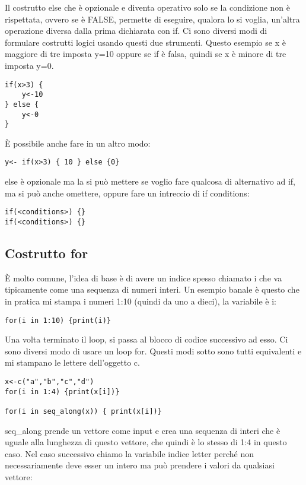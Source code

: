 Il costrutto \textsf{else} che è opzionale e diventa operativo solo se la condizione non è rispettata, ovvero se è \textsf{FALSE}, permette di eseguire, qualora lo si voglia, un'altra operazione diversa dalla prima dichiarata con \textsf{if}. Ci sono diversi modi di formulare costrutti logici usando questi due strumenti.
Questo esempio se x è maggiore di tre \erre imposta y=10 oppure se if è falsa,
quindi se x è minore di tre \erre imposta y=0.
\begin{lstlisting}
if(x>3) {
	y<-10
} else {
	y<-0
}
\end{lstlisting}
È possibile anche fare in un altro modo:
\begin{lstlisting}
y<- if(x>3) { 10 } else {0}
\end{lstlisting}

else è opzionale ma la si può mettere se voglio fare qualcosa di alternativo ad if, ma si può anche omettere, oppure fare un intreccio
di if conditions:
\begin{lstlisting}
if(<conditions>) {}
if(<conditions>) {}
\end{lstlisting}

\subsection{Costrutto for}

È molto comune, l'idea di base è di avere un indice spesso chiamato i che va tipicamente
come una sequenza di numeri interi.
Un esempio banale è questo che in pratica mi stampa i numeri 1:10
(quindi da uno a dieci), la variabile è i:

\begin{lstlisting}
for(i in 1:10) {print(i)}
\end{lstlisting}

Una volta terminato il loop, si passa al blocco di codice successivo ad esso.
Ci sono diversi modo di usare un loop for.
Questi modi sotto sono tutti equivalenti e mi stampano le lettere dell'oggetto c.

\begin{lstlisting}
x<-c("a","b","c","d")
for(i in 1:4) {print(x[i])}

for(i in seq_along(x)) { print(x[i])} 
\end{lstlisting}

seq\_along prende un vettore come input e crea una sequenza di interi
che è uguale alla lunghezza di questo vettore, che quindi è lo stesso di 1:4 in questo caso.
Nel caso successivo chiamo la variabile indice letter perché non necessariamente deve esser un intero ma può prendere i valori da qualsiasi vettore:

